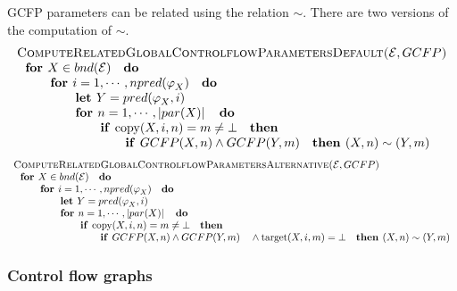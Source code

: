 GCFP parameters can be related using the relation $\sim $. There are two
versions of the computation of $\sim $.%
\begin{equation*}
\begin{tabular}{l}
\textsc{ComputeRelatedGlobalControlflowParametersDefault(}$\mathcal{E},GCFP$%
\textsc{)} \\ 
$\text{\textbf{for }}X\in bnd(\mathcal{E})\text{ \textbf{do}}$ \\ 
$\qquad \text{\textbf{for }}i=1,\cdots ,npred(\varphi _{X})\text{ \textbf{do}%
}$ \\ 
$\qquad \qquad \text{\textbf{let }}Y=pred(\varphi _{X},i)$ \\ 
$\qquad \qquad \text{\textbf{for }}n=1,\cdots ,\left\vert par(X)\right\vert 
\text{ \textbf{do}}$ \\ 
$\qquad \qquad \qquad \text{\textbf{if }}\mathrm{copy}(X,i,n)=m\neq \bot 
\text{ \textbf{then}}$ \\ 
$\qquad \qquad \qquad \qquad \text{\textbf{if }}GCFP(X,n)\wedge GCFP(Y,m)%
\text{ \textbf{then }}(X,n)\sim (Y,m)$%
\end{tabular}%
\end{equation*}%
\begin{equation*}
\begin{tabular}{l}
\textsc{ComputeRelatedGlobalControlflowParametersAlternative(}$\mathcal{E}%
,GCFP$\textsc{)} \\ 
$\text{\textbf{for }}X\in bnd(\mathcal{E})\text{ \textbf{do}}$ \\ 
$\qquad \text{\textbf{for }}i=1,\cdots ,npred(\varphi _{X})\text{ \textbf{do}%
}$ \\ 
$\qquad \qquad \text{\textbf{let }}Y=pred(\varphi _{X},i)$ \\ 
$\qquad \qquad \text{\textbf{for }}n=1,\cdots ,\left\vert par(X)\right\vert 
\text{ \textbf{do}}$ \\ 
$\qquad \qquad \qquad \text{\textbf{if }}\mathrm{copy}(X,i,n)=m\neq \bot 
\text{ \textbf{then}}$ \\ 
$\qquad \qquad \qquad \qquad \text{\textbf{if }}GCFP(X,n)\wedge GCFP(Y,m)%
\text{ }\wedge \mathrm{target}(X,i,m)=\bot \text{ \textbf{then }}(X,n)\sim
(Y,m)$%
\end{tabular}%
\end{equation*}

\subsubsection{Control flow graphs}

